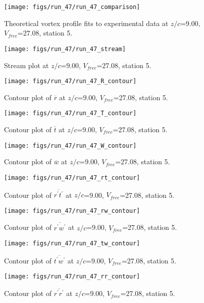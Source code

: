 \begin{figure}[H]
\centering
\texttt{[image: figs/run\_47/run\_47\_comparison]}
\caption{Theoretical vortex profile fits to experimental data at $z/c$=9.00, $V_{free}$=27.08, station 5.}
\end{figure}


\begin{figure}[H]
\centering
\texttt{[image: figs/run\_47/run\_47\_stream]}
\caption{Stream plot at $z/c$=9.00, $V_{free}$=27.08, station 5.}
\end{figure}


\begin{figure}[H]
\centering
\texttt{[image: figs/run\_47/run\_47\_R\_contour]}
\caption{Contour plot of $\overline{r}$ at $z/c$=9.00, $V_{free}$=27.08, station 5.}
\end{figure}


\begin{figure}[H]
\centering
\texttt{[image: figs/run\_47/run\_47\_T\_contour]}
\caption{Contour plot of $\overline{t}$ at $z/c$=9.00, $V_{free}$=27.08, station 5.}
\end{figure}


\begin{figure}[H]
\centering
\texttt{[image: figs/run\_47/run\_47\_W\_contour]}
\caption{Contour plot of $\overline{w}$ at $z/c$=9.00, $V_{free}$=27.08, station 5.}
\end{figure}


\begin{figure}[H]
\centering
\texttt{[image: figs/run\_47/run\_47\_rt\_contour]}
\caption{Contour plot of $\overline{r^\prime t^\prime}$ at $z/c$=9.00, $V_{free}$=27.08, station 5.}
\end{figure}


\begin{figure}[H]
\centering
\texttt{[image: figs/run\_47/run\_47\_rw\_contour]}
\caption{Contour plot of $\overline{r^\prime w^\prime}$ at $z/c$=9.00, $V_{free}$=27.08, station 5.}
\end{figure}


\begin{figure}[H]
\centering
\texttt{[image: figs/run\_47/run\_47\_tw\_contour]}
\caption{Contour plot of $\overline{t^\prime w^\prime}$ at $z/c$=9.00, $V_{free}$=27.08, station 5.}
\end{figure}


\begin{figure}[H]
\centering
\texttt{[image: figs/run\_47/run\_47\_rr\_contour]}
\caption{Contour plot of $\overline{r^\prime r^\prime}$ at $z/c$=9.00, $V_{free}$=27.08, station 5.}
\end{figure}


